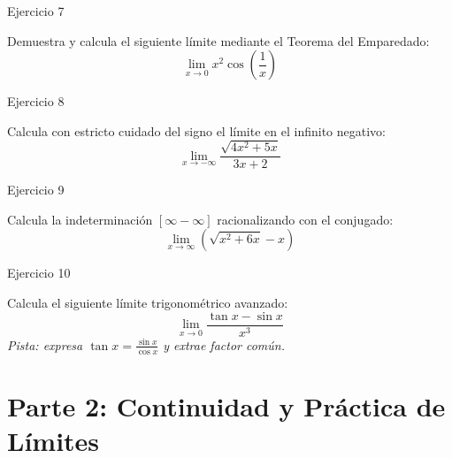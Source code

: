 \documentclass[aspectratio=169]{beamer}
\begin{document}
\begin{frame}{Ejercicio 7}
  \begin{mwejercicio}
    Demuestra y calcula el siguiente límite mediante el Teorema del Emparedado:
    $$\lim_{x \to 0} x^2 \cos\left(\frac{1}{x}\right)$$
  \end{mwejercicio}
  \vspace{3.5cm}
\end{frame}
\begin{frame}{Ejercicio 8}
  \begin{mwejercicio}
    Calcula con estricto cuidado del signo el límite en el infinito negativo:
    $$\lim_{x \to -\infty} \frac{\sqrt{4x^2 + 5x}}{3x + 2}$$
  \end{mwejercicio}
  \vspace{3.5cm}
\end{frame}
\begin{frame}{Ejercicio 9}
  \begin{mwejercicio}
    Calcula la indeterminación $[\infty - \infty]$ racionalizando con el conjugado:
    $$\lim_{x \to \infty} \left(\sqrt{x^2 + 6x} - x\right)$$
  \end{mwejercicio}
  \vspace{3.5cm}
\end{frame}
\begin{frame}{Ejercicio 10}
  \begin{mwejercicio}
    Calcula el siguiente límite trigonométrico avanzado:
    $$\lim_{x \to 0} \frac{\tan x - \sin x}{x^3}$$
    \emph{Pista: expresa $\tan x = \frac{\sin x}{\cos x}$ y extrae factor común.}
  \end{mwejercicio}
  \vspace{3.5cm}
\end{frame}


\section{Parte 2: Continuidad y Práctica de Límites}
\end{document}
